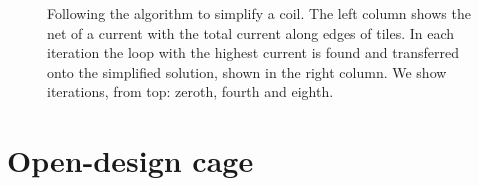 \begin{figure}
  \centering
  \quad
  \caption{Following the algorithm to simplify a coil. The left column shows the net of a current with the total current along edges of tiles. In each iteration the loop with the highest current is found and transferred onto the simplified solution, shown in the right column. We show iterations, from top: zeroth, fourth and eighth.}
  \label{fig:prototype_compensation}
\end{figure}



\section{Open-design cage}

